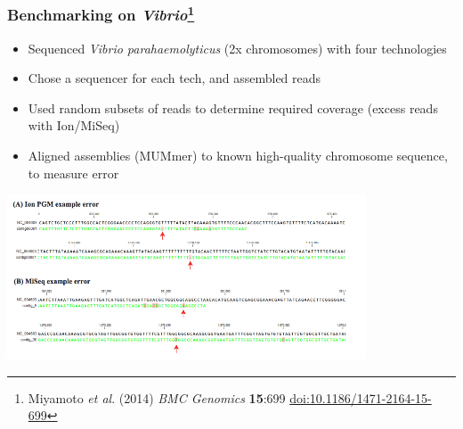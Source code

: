 \begin{frame}
  \frametitle{Benchmarking on \textit{Vibrio}\footnote{\tiny{Miyamoto \textit{et al}. (2014) \textit{BMC Genomics} \textbf{15}:699 \href{http://dx.doi.org/10.1186/1471-2164-15-699}{doi:10.1186/1471-2164-15-699}}}}
    \begin{itemize}
      \item Sequenced \textit{Vibrio parahaemolyticus} (2x chromosomes) with four technologies
      \item Chose a sequencer for each tech, and assembled reads
      \item Used random subsets of reads to determine required coverage (excess reads with Ion/MiSeq)
      \item Aligned assemblies (MUMmer) to known high-quality chromosome sequence, to measure error
    \end{itemize}      
    \begin{center}
      \includegraphics[width=0.8\textwidth]{images/miyamoto_errors}
    \end{center}      
\end{frame}

